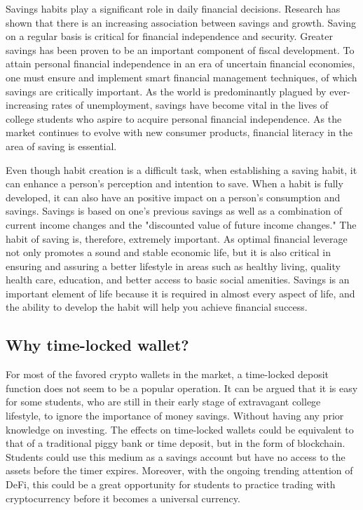\documentclass[10pt,twocolumn]{article}
\begin{document}
Savings habits play a significant role in daily financial decisions. Research has shown that there is an increasing association between savings and growth. Saving on a regular basis is critical for financial independence and security. Greater savings has been proven to be an important component of fiscal development. To attain personal financial independence in an era of uncertain financial economies, one must ensure and implement smart financial management techniques, of which savings are critically important. As the world is predominantly plagued by ever-increasing rates of unemployment, savings have become vital in the lives of college students who aspire to acquire personal financial independence.\cite{Fiergbor} As the market continues to evolve with new consumer products, financial literacy in the area of saving is essential.

Even though habit creation is a difficult task, when establishing a saving habit, it can enhance a person's perception and intention to save. When a habit is fully developed, it can also have an positive impact on a person's consumption and savings. Savings is based on one's previous savings as well as a combination of current income changes and the "discounted value of future income changes." The habit of saving is, therefore, extremely important. As optimal financial leverage not only promotes a sound and stable economic life, but it is also critical in ensuring and assuring a better lifestyle in areas such as healthy living, quality health care, education, and better access to basic social amenities.\cite{Alessie} Savings is an important element of life because it is required in almost every aspect of life, and the ability to develop the habit will help you achieve financial success.

\subsection{Why time-locked wallet?}

For most of the favored crypto wallets in the market, a time-locked deposit function does not seem to be a popular operation. It can be argued that it is easy for some students, who are still in their early stage of extravagant college lifestyle, to ignore the importance of money savings. Without having any prior knowledge on investing. The effects on time-locked wallets could be equivalent to that of a traditional piggy bank or time deposit, but in the form of blockchain. Students could use this medium as a savings account but have no access to the assets before the timer expires. Moreover, with the ongoing trending attention of DeFi, this could be a great opportunity for students to practice trading with cryptocurrency before it becomes a universal currency.
\end{document}

